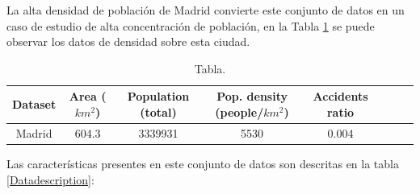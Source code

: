 \documentclass{uathesis-es}
\begin{document}
{	La alta densidad de población de Madrid convierte este conjunto de datos en un caso de estudio de alta concentración de población, en la Tabla \ref{Madrid_statistics} se puede observar los datos de densidad sobre esta ciudad.
	
	\begin{table}[H]
		\begin{center}
			\begin{tabular}{|c|c||c|c|c|c|c|c|}
				\hline
				
				\textbf{Dataset} & \textbf{Area ($km^2$)} & \textbf{Population (total)} & \textbf{Pop. density (people/$km^2$)} & \textbf{Accidents ratio}
				\\ \hline \hline
				
				Madrid & 604.3 & 3339931 & 5530 & 0.004\\ \hline
				
			\end{tabular}
		\end{center}
		\caption{Tabla.}
		\label{Madrid_statistics}
	\end{table}
	
	Las características presentes en este conjunto de datos son descritas en la tabla \ref{Datadescription}:
	
}
\end{document}
